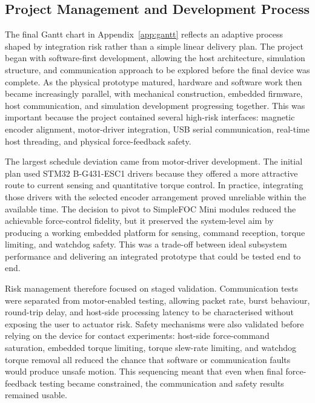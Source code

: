 \subsection{Project Management and Development Process} \label{sec:discussion_project_management}

The final Gantt chart in Appendix~\ref{app:gantt} reflects an adaptive process shaped by integration risk rather than a simple linear delivery plan. The project began with software-first development, allowing the host architecture, simulation structure, and communication approach to be explored before the final device was complete. As the physical prototype matured, hardware and software work then became increasingly parallel, with mechanical construction, embedded firmware, host communication, and simulation development progressing together. This was important because the project contained several high-risk interfaces: magnetic encoder alignment, motor-driver integration, USB serial communication, real-time host threading, and physical force-feedback safety.

The largest schedule deviation came from motor-driver development. The initial plan used STM32 B-G431-ESC1 drivers because they offered a more attractive route to current sensing and quantitative torque control. In practice, integrating those drivers with the selected encoder arrangement proved unreliable within the available time. The decision to pivot to SimpleFOC Mini modules reduced the achievable force-control fidelity, but it preserved the system-level aim by producing a working embedded platform for sensing, command reception, torque limiting, and watchdog safety. This was a trade-off between ideal subsystem performance and delivering an integrated prototype that could be tested end to end.

Risk management therefore focused on staged validation. Communication tests were separated from motor-enabled testing, allowing packet rate, burst behaviour, round-trip delay, and host-side processing latency to be characterised without exposing the user to actuator risk. Safety mechanisms were also validated before relying on the device for contact experiments: host-side force-command saturation, embedded torque limiting, torque slew-rate limiting, and watchdog torque removal all reduced the chance that software or communication faults would produce unsafe motion. This sequencing meant that even when final force-feedback testing became constrained, the communication and safety results remained usable.

